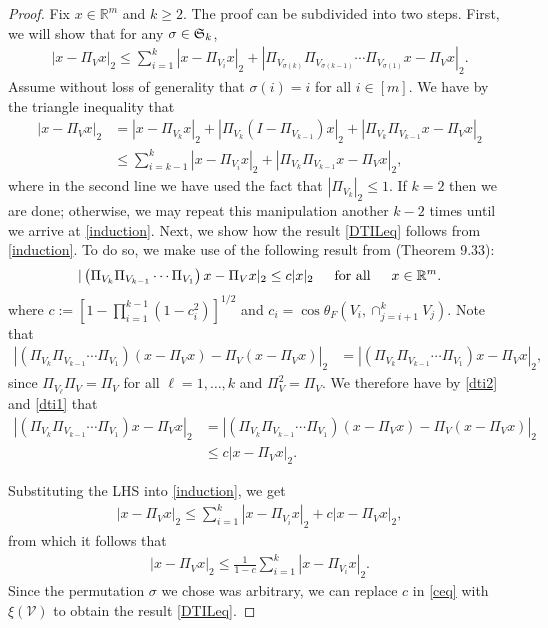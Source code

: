 \documentclass[journal, onecolumn]{IEEEtran}
\begin{document}
\begin{proof} 
Fix $x \in \mathbb{R}^m$ and $k \geq 2$. The proof can be subdivided into two steps. First, we will show that for any $\sigma \in \frak{S}_k$,
\begin{align}\label{induction}
|x - \Pi_Vx|_2 \leq \sum_{i=1}^k |x - \Pi_{V_i} x|_2 + |\Pi_{V_{\sigma(k)}}\Pi_{V_{\sigma(k-1)}}\cdots\Pi_{V_{\sigma(1)}} x - \Pi_V x|_2.
\end{align}
%
Assume without loss of generality that $\sigma(i) = i$ for all $i \in [m]$. We have by the triangle inequality that
\begin{align*}
|x - \Pi_Vx|_2 &= |x - \Pi_{V_k} x|_2 + |\Pi_{V_k}(I - \Pi_{V_{k-1}}) x|_2 + |\Pi_{V_k}\Pi_{V_{k-1}}x - \Pi_Vx|_2 \\
&\leq \sum_{i=k-1}^k|x - \Pi_{V_i} x|_2 + |\Pi_{V_k}\Pi_{V_{k-1}} x - \Pi_V x|_2,
\end{align*}
%
where in the second line we have used the fact that $|\Pi_{V_k}|_2 \leq 1$. If $k=2$ then we are done; otherwise, we may repeat this manipulation another $k-2$ times until we arrive at \eqref{induction}. Next, we show how the result \eqref{DTILeq} follows from \eqref{induction}. To do so, we make use of the following result from \cite{Deutsch} (Theorem 9.33):
\begin{align}\label{dti2}
|\left(\Pi_{V_k}\Pi_{V_{k-1}}\cdots\Pi_{V_1}\right)x - \Pi_Vx|_2 \leq c |x|_2 \indent \text{for all} \indent x \in \mathbb{R}^m.
\end{align}
%
where $c:= \left[1 - \prod_{i=1}^{k-1}(1-c_i^2)\right]^{1/2}$ and $c_i = \cos\theta_F\left(V_i, \cap_{j=i+1}^kV_j\right)$. Note that
\begin{align}\label{dti1}
|(\Pi_{V_k}\Pi_{V_{k-1}}\cdots\Pi_{V_1})(x - \Pi_Vx) - \Pi_V(x - \Pi_Vx)|_2 
&= |(\Pi_{V_k}\Pi_{V_{k-1}}\cdots\Pi_{V_1}) x - \Pi_V x |_2,
\end{align}
%
since $\Pi_{V_\ell} \Pi_V = \Pi_V$ for all $\ell = 1, \ldots, k$ and $\Pi_V^2 = \Pi_V$.
%
We therefore have by \eqref{dti2} and \eqref{dti1} that
\begin{align*}
|(\Pi_{V_k}\Pi_{V_{k-1}}\cdots\Pi_{V_1}) x - \Pi_V x |_2
&= |(\Pi_{V_k}\Pi_{V_{k-1}}\cdots\Pi_{V_1})(x - \Pi_Vx) - \Pi_V(x - \Pi_Vx)|_2 \\
&\leq c |x - \Pi_Vx|_2.
\end{align*}

Substituting the LHS into \eqref{induction}, we get
\begin{align*}
|x - \Pi_Vx|_2 \leq \sum_{i=1}^k |x - \Pi_{V_i} x|_2 + c |x - \Pi_Vx|_2,
\end{align*}
%
from which it follows that
\begin{align}\label{ceq}
|x - \Pi_V x|_2 \leq \frac{1}{1 - c} \sum_{i=1}^k |x - \Pi_{V_i} x|_2.
\end{align}
Since the permutation $\sigma$ we chose was arbitrary, we can replace $c$ in \eqref{ceq} with $\xi(\mathcal{V})$ to obtain the result \eqref{DTILeq}.
\end{proof}
\end{document}
